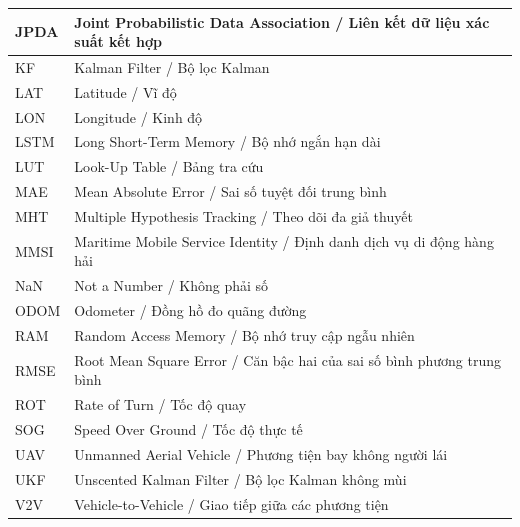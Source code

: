 \begin{longtable}{|p{3cm}|p{10cm}|}
\hline
JPDA & Joint Probabilistic Data Association / Liên kết dữ liệu xác suất kết hợp \\
\hline
KF & Kalman Filter / Bộ lọc Kalman \\
\hline
LAT & Latitude / Vĩ độ \\
\hline
LON & Longitude / Kinh độ \\
\hline
LSTM & Long Short-Term Memory / Bộ nhớ ngắn hạn dài \\
\hline
LUT & Look-Up Table / Bảng tra cứu \\
\hline
MAE & Mean Absolute Error / Sai số tuyệt đối trung bình \\
\hline
MHT & Multiple Hypothesis Tracking / Theo dõi đa giả thuyết \\
\hline
MMSI & Maritime Mobile Service Identity / Định danh dịch vụ di động hàng hải \\
\hline
NaN & Not a Number / Không phải số \\
\hline
ODOM & Odometer / Đồng hồ đo quãng đường \\
\hline
RAM & Random Access Memory / Bộ nhớ truy cập ngẫu nhiên \\
\hline
RMSE & Root Mean Square Error / Căn bậc hai của sai số bình phương trung bình \\
\hline
ROT & Rate of Turn / Tốc độ quay \\
\hline
SOG & Speed Over Ground / Tốc độ thực tế \\
\hline
UAV & Unmanned Aerial Vehicle / Phương tiện bay không người lái \\
\hline
UKF & Unscented Kalman Filter / Bộ lọc Kalman không mùi \\
\hline
V2V & Vehicle-to-Vehicle / Giao tiếp giữa các phương tiện \\
\hline

\end{longtable}

